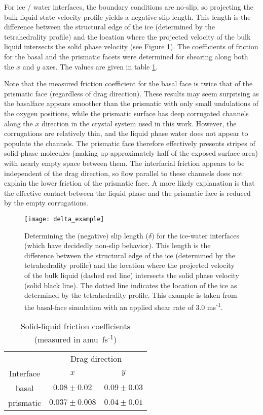\documentclass[11pt]{article}
\begin{document}
\begin{doublespace}
For ice / water interfaces, the boundary conditions are no-slip, so
projecting the bulk liquid state velocity profile yields a negative
slip length. This length is the difference between the structural edge
of the ice (determined by the tetrahedrality profile) and the location
where the projected velocity of the bulk liquid intersects the solid
phase velocity (see Figure \ref{fig:delta_example}). The coefficients
of friction for the basal and the prismatic facets were determined for
shearing along both the $x$ and $y$ axes.  The values are given in
table \ref{tab:lambda}. 

Note that the measured friction coefficient for the basal face is
twice that of the prismatic face (regardless of drag direction).
These results may seem surprising as the basalface appears smoother
than the prismatic with only small undulations of the oxygen
positions, while the prismatic surface has deep corrugated channels
along the $x$ direction in the crystal system used in this work.
However, the corrugations are relatively thin, and the liquid phase
water does not appear to populate the channels.  The prismatic face
therefore effectively presents stripes of solid-phase molecules
(making up approximately half of the exposed surface area) with nearly
empty space between them. The interfacial friction appears to be
independent of the drag direction, so flow parallel to these channels
does not explain the lower friction of the prismatic face.  A more
likely explanation is that the effective contact between the liquid
phase and the prismatic face is reduced by the empty corrugations.  

\begin{figure}
\texttt{[image: delta\_example]}
\caption{\label{fig:delta_example} Determining the (negative) slip
  length ($\delta$) for the ice-water interfaces (which have decidedly
  non-slip behavior).  This length is the difference between the
  structural edge of the ice (determined by the tetrahedrality
  profile) and the location where the projected velocity of the bulk
  liquid (dashed red line) intersects the solid phase velocity (solid
  black line).  The dotted line indicates the location of the ice as
  determined by the tetrahedrality profile.  This example is taken
  from the basal-face simulation with an applied shear rate of 3.0 ms\textsuperscript{-1}.}
\end{figure}


\begin{table}[h]
\centering
\caption{Solid-liquid friction coefficients (measured in amu~fs\textsuperscript{-1}) }
\label{tab:lambda}
\begin{tabular}{|ccc|}  \hline
           & \multicolumn{2}{c|}{Drag direction} \\ 
 Interface & $x$               & $y$  \\ \hline
     basal &  $0.08 \pm 0.02$  & $0.09 \pm 0.03$ \\
 prismatic & $0.037 \pm 0.008$ & $0.04 \pm 0.01$ \\ \hline
\end{tabular}
\end{table}



\end{doublespace}
\end{document}
